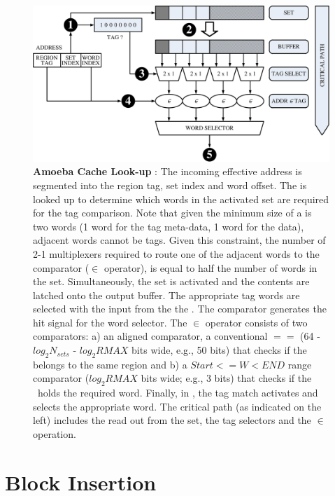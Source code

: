 \begin{figure}[h]
  \includegraphics[width=\textwidth]{files/Figures/06-Lookup.pdf}
  \caption[Amoeba Cache Look-up]{\textbf{Amoeba Cache Look-up} : The incoming effective address is segmented into the region tag, set index and word offset.  The  is looked up to determine which words in the activated set are required for the tag comparison. Note that given the minimum size of a \AB{} is two words (1 word for the tag meta-data, 1 word for the data), adjacent words cannot be tags. Given this constraint, 
  the number of 2-1 multiplexers required to route one of the adjacent words to the comparator ($\in$ operator), is equal to half the number of words in the set.  Simultaneously, the set is activated and the contents are latched onto the output buffer.  The appropriate tag words are selected with the input from the the .  The comparator generates the hit signal for the word selector. The $\in$ operator consists of two comparators: a) an aligned  comparator, a conventional $==$ (64 - $log_2N_{sets}$ - $log_2{RMAX}$ bits wide, e.g., 50 bits) that checks if the \AB{} belongs to the same region and b) a $ Start <= W < END $ range comparator ($log_2RMAX$ bits wide; e.g., 3 bits) that checks if the \AB\ holds the required word. Finally, in , the tag match activates and selects the appropriate word. The critical path (as indicated on the left) includes the read out from the set, the tag selectors and the $\in$ operation.}
  \label{fig:ac_lookup}
\end{figure}

\clearpage

\section{Block Insertion}

